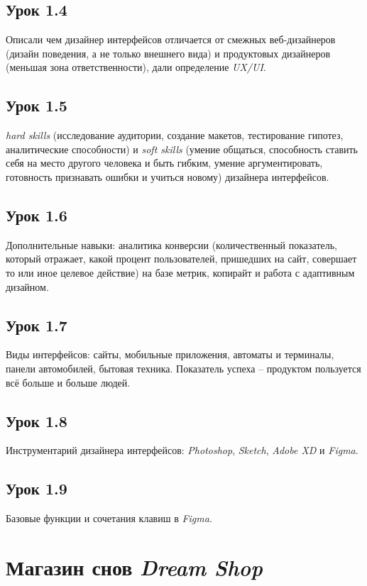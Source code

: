 \documentclass[variant=practice]{bsuir}
\begin{document}
\subsection{Урок 1.4} Описали чем дизайнер интерфейсов отличается от смежных
веб-дизайнеров (дизайн поведения, а не только внешнего вида) и продуктовых
дизайнеров (меньшая зона ответственности), дали определение \textit{UX/UI}.

\subsection{Урок 1.5} \textit{hard skills} (исследование аудитории, создание
макетов, тестирование гипотез, аналитические способности) и \textit{soft skills}
(умение общаться, способность ставить себя на место другого человека и быть
гибким, умение аргументировать, готовность признавать ошибки и учиться новому)
дизайнера интерфейсов.

\subsection{Урок 1.6} Дополнительные навыки: аналитика конверсии (количественный
показатель, который отражает, какой процент пользователей, пришедших на сайт,
совершает то или иное целевое действие) на базе метрик, копирайт и работа с
адаптивным дизайном.

\subsection{Урок 1.7} Виды интерфейсов: сайты, мобильные приложения, автоматы и
терминалы, панели автомобилей, бытовая техника. Показатель успеха -- продуктом
пользуется всё больше и больше людей.

\subsection{Урок 1.8} Инструментарий дизайнера интерфейсов: \textit{Photoshop},
\textit{Sketch}, \textit{Adobe XD} и \textit{Figma}.

\subsection{Урок 1.9} Базовые функции и сочетания клавиш в \textit{Figma}.

\section{Магазин снов \textit{Dream Shop}}
\end{document}
